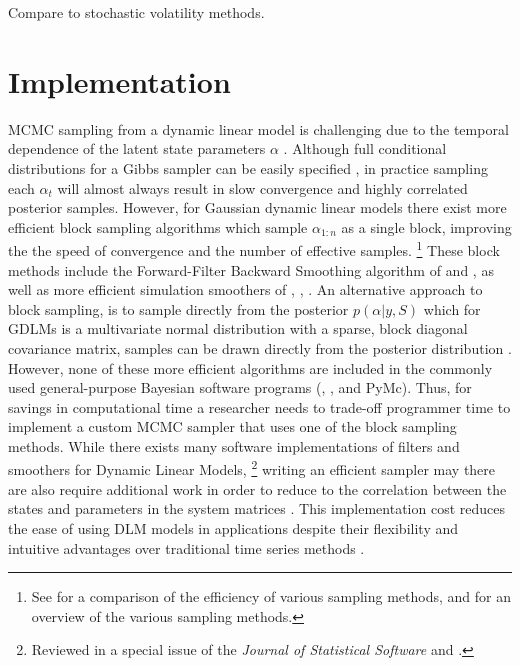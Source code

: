 \documentclass{article}
\begin{document}
Compare to stochastic volatility methods.

\section{Implementation}
\label{sec:implementation}

MCMC sampling from a dynamic linear model is challenging due to the temporal dependence of the latent state parameters $\alpha$ \parencite{ReisSalazarGamerman2006}.
Although full conditional distributions for a Gibbs sampler can be easily specified \parencite{CarlinGelfandSmith1992}, in practice sampling each $\alpha_{t}$ will almost always result in slow convergence and highly correlated posterior samples.
However, for Gaussian dynamic linear models there exist more efficient block sampling algorithms which sample $\alpha_{1:n}$ as a single block, improving the the speed of convergence and the number of effective samples.%
\footnote{See \textcite{ReisSalazarGamerman2006} for a comparison of the efficiency of various sampling methods, and \textcite{migon2005dynamic} for an overview of the various sampling methods.}
These block methods include the Forward-Filter Backward Smoothing algorithm of \textcite{CarterKohn1994} and \textcite{Fruehwirth-Schnatter1994}, as well as more efficient simulation smoothers of \textcite{DeJongShephard1995}, \textcite{DurbinKoopman2002}, \textcite{StricklandTurnerDenhamOmegal2009}.%
An alternative approach to block sampling, is to sample directly from the posterior $p(\alpha | y, S)$ which for GDLMs is a multivariate normal distribution with a sparse, block diagonal covariance matrix, samples can be drawn directly from the posterior distribution \parencites{migon2005dynamic}{ChanJeliazkov2009}.
However, none of these more efficient algorithms are included in the commonly used general-purpose Bayesian software programs (, , and PyMc).
Thus, for savings in computational time a researcher needs to trade-off programmer time to implement a custom MCMC sampler that uses one of the block sampling methods.
While there exists many software implementations of filters and smoothers for Dynamic Linear Models,%
\footnote{Reviewed in a special issue of the \textit{Journal of Statistical Software} \textcite{CommandeurKoopmanOoms2011} and \textcite{Tusell2011}.}
writing an efficient sampler may there are also require additional work in order to reduce to the correlation between the states and parameters in the system matrices \parencites{ReisSalazarGamerman2006}{ChibNardariShephard2006}.
This implementation cost reduces the ease of using DLM models in applications despite their flexibility and intuitive advantages over traditional time series methods \textcite[51]{DurbinKoopman2001}.
\end{document}
